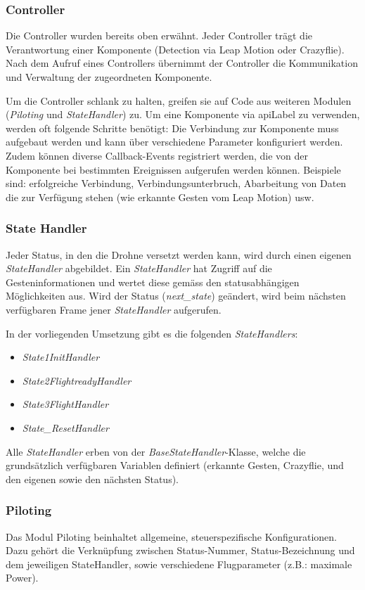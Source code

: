 \subsubsection{Controller}
Die Controller wurden bereits oben erwähnt. Jeder Controller trägt die Verantwortung einer Komponente (Detection via Leap Motion oder Crazyflie).
Nach dem Aufruf eines Controllers übernimmt der Controller die Kommunikation und Verwaltung der zugeordneten Komponente.

Um die Controller schlank zu halten, greifen sie auf Code aus weiteren Modulen (\textit{Piloting} und \textit{StateHandler}) zu.
Um eine Komponente via \gls{apiLabel} zu verwenden, werden oft folgende Schritte benötigt:
Die Verbindung zur Komponente muss aufgebaut werden und kann über verschiedene Parameter konfiguriert werden.
Zudem können diverse Callback-Events registriert werden, die von der Komponente bei bestimmten Ereignissen aufgerufen werden können. Beispiele sind: erfolgreiche Verbindung, Verbindungsunterbruch, Abarbeitung von Daten die zur Verfügung stehen (wie erkannte Gesten vom Leap Motion) usw.

\subsubsection{State Handler}
Jeder Status, in den die Drohne versetzt werden kann, wird durch einen eigenen \textit{StateHandler} abgebildet.
Ein \textit{StateHandler} hat Zugriff auf die Gesteninformationen und wertet diese gemäss den statusabhängigen Möglichkeiten aus.
Wird der Status (\textit{next\_state}) geändert, wird beim nächsten verfügbaren Frame jener \textit{StateHandler} aufgerufen.

In der vorliegenden Umsetzung gibt es die folgenden \textit{StateHandlers}:
\begin{itemize}
	\item \textit{State1InitHandler}
	\item \textit{State2FlightreadyHandler}
	\item \textit{State3FlightHandler}
	\item \textit{State\_ResetHandler}
\end{itemize}
Alle \textit{StateHandler} erben von der \textit{BaseStateHandler}-Klasse, welche die grundsätzlich verfügbaren Variablen definiert (erkannte Gesten, Crazyflie, und den eigenen sowie den nächsten Status).

\subsubsection{Piloting}
Das Modul Piloting beinhaltet allgemeine, steuerspezifische Konfigurationen.
Dazu gehört die Verknüpfung zwischen Status-Nummer, Status-Bezeichnung und dem jeweiligen StateHandler, sowie verschiedene Flugparameter (z.B.: maximale Power).

